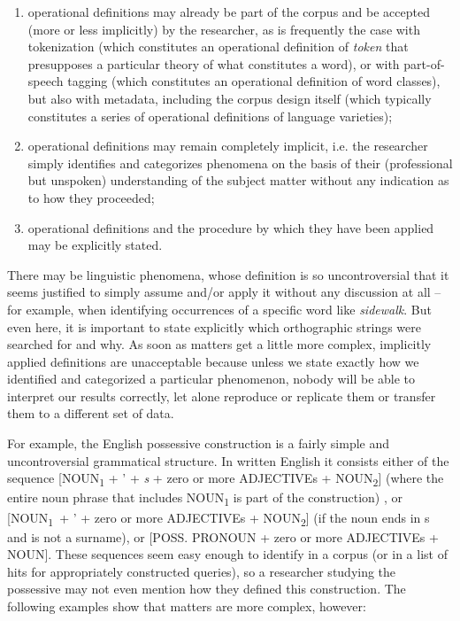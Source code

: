 \begin{enumerate}
\item operational  definitions may already be part of the corpus and be accepted (more or less implicitly) by the researcher, as is frequently the case with tokenization  (which constitutes an operational definition of \textit{token} that presupposes a particular theory of what constitutes a word), or with part\hyp{}of\hyp{}speech tagging  (which constitutes an operational definition of word classes), but also with metadata,  including the corpus design  itself (which typically constitutes a series of operational definitions of language  varieties);
\item operational  definitions may remain completely implicit, i.e. the researcher simply identifies and categorizes  phenomena on the basis of their (professional but unspoken) understanding of the subject matter without any indication as to how they proceeded;
\item operational  definitions and the procedure by which they have been applied may be explicitly stated.
\end{enumerate}

There may be linguistic phenomena, whose definition is so uncontroversial that it seems justified to simply assume and\slash or apply it without any discussion at all -- for example, when identifying occurrences of a specific word like \textit{sidewalk}. But even here, it is important to state explicitly which orthographic strings were searched for and why. As soon as matters get a little more complex, implicitly applied definitions are unacceptable because unless we state exactly how we identified and categorized  a particular phenomenon, nobody will be able to interpret our results correctly, let alone reproduce  or replicate  them or transfer them to a different set of data.

For example, the English possessive  construction is a fairly simple and uncontroversial grammatical structure. In written  English it consists either of the sequence [NOUN\textsubscript{1} + ' + \textit{s} + zero or more ADJECTIVEs + NOUN\textsubscript{2}] (where the entire noun  phrase that includes NOUN\textsubscript{1} is part of the construction) , or [NOUN\textsubscript{1}~+ ' + zero or more ADJECTIVEs + NOUN\textsubscript{2}] (if the noun ends in s and is not a surname), or [POSS. PRONOUN + zero or more ADJECTIVEs + NOUN]. These sequences seem easy enough to identify in a corpus (or in a list of hits  for appropriately constructed queries),  so a researcher studying the possessive may not even mention how they defined this construction. The following examples show that matters are more complex, however:

